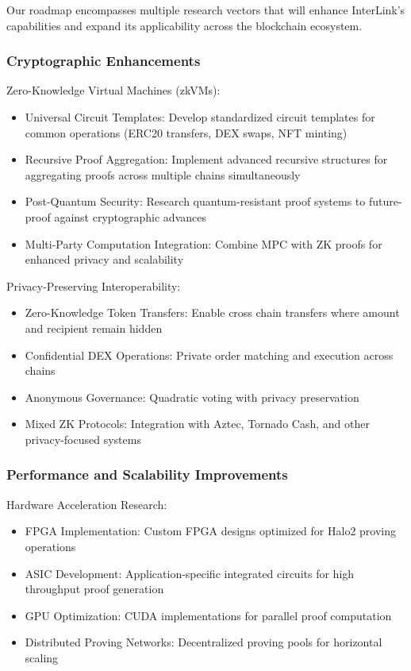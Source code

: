 \documentclass[11pt,a4paper]{article}
\begin{document}
Our roadmap encompasses multiple research vectors that will enhance InterLink's capabilities and expand its applicability across the blockchain ecosystem.

\subsubsection{Cryptographic Enhancements}

Zero-Knowledge Virtual Machines (zkVMs):
\begin{itemize}
    \item Universal Circuit Templates: Develop standardized circuit templates for common operations (ERC20 transfers, DEX swaps, NFT minting)
    \item Recursive Proof Aggregation: Implement advanced recursive structures for aggregating proofs across multiple chains simultaneously
    \item Post-Quantum Security: Research quantum-resistant proof systems to future-proof against cryptographic advances
    \item Multi-Party Computation Integration: Combine MPC with ZK proofs for enhanced privacy and scalability
\end{itemize}

Privacy-Preserving Interoperability:
\begin{itemize}
    \item Zero-Knowledge Token Transfers: Enable cross chain transfers where amount and recipient remain hidden
    \item Confidential DEX Operations: Private order matching and execution across chains
    \item Anonymous Governance: Quadratic voting with privacy preservation
    \item Mixed ZK Protocols: Integration with Aztec, Tornado Cash, and other privacy-focused systems
\end{itemize}

\subsubsection{Performance and Scalability Improvements}

Hardware Acceleration Research:
\begin{itemize}
    \item FPGA Implementation: Custom FPGA designs optimized for Halo2 proving operations
    \item ASIC Development: Application-specific integrated circuits for high throughput proof generation
    \item GPU Optimization: CUDA implementations for parallel proof computation
    \item Distributed Proving Networks: Decentralized proving pools for horizontal scaling
\end{itemize}
\end{document}
